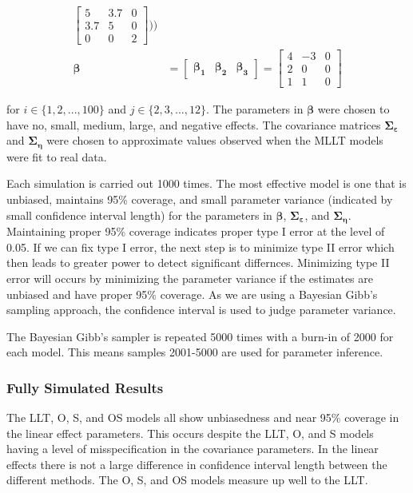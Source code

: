 \documentclass[
]{article}
\begin{document}
\begin{equation*}
\begin{aligned}
\begin{bmatrix}
5 & 3.7 & 0\\
3.7 & 5 & 0\\
0 & 0 & 2
\end{bmatrix})
)\\
\boldsymbol{\beta} &= \begin{bmatrix} \boldsymbol{\beta_1} & \boldsymbol{\beta_2} &  \boldsymbol{\beta_3} \end{bmatrix} = 
\begin{bmatrix}
4 & -3 & 0\\
2 & 0 & 0\\
1 & 1 & 0
\end{bmatrix}
\end{aligned}
\end{equation*}

for \(i \in \{1, 2, ..., 100\}\) and \(j \in \{2, 3,..., 12\}\). The parameters in \(\boldsymbol{\beta}\) were chosen to have no, small, medium, large, and negative effects. The covariance matrices \(\boldsymbol{\Sigma_\varepsilon}\) and \(\boldsymbol{\Sigma_\eta}\) were chosen to approximate values observed when the MLLT models were fit to real data.

Each simulation is carried out 1000 times. The most effective model is one that is unbiased, maintains 95\% coverage, and small parameter variance (indicated by small confidence interval length) for the parameters in \(\boldsymbol{\beta}\), \(\boldsymbol{\Sigma_\varepsilon}\), and \(\boldsymbol{\Sigma_\eta}\). Maintaining proper 95\% coverage indicates proper type I error at the level of 0.05. If we can fix type I error, the next step is to minimize type II error which then leads to greater power to detect significant differnces. Minimizing type II error will occurs by minimizing the parameter variance if the estimates are unbiased and have proper 95\% coverage. As we are using a Bayesian Gibb's sampling approach, the confidence interval is used to judge parameter variance.

The Bayesian Gibb's sampler is repeated 5000 times with a burn-in of 2000 for each model. This means samples 2001-5000 are used for parameter inference.

\hypertarget{fully-simulated-results}{%
\subsubsection{Fully Simulated Results}\label{fully-simulated-results}}

The LLT, O, S, and OS models all show unbiasedness and near 95\% coverage in the linear effect parameters. This occurs despite the LLT, O, and S models having a level of misspecification in the covariance parameters. In the linear effects there is not a large difference in confidence interval length between the different methods. The O, S, and OS models measure up well to the LLT.
\end{document}
